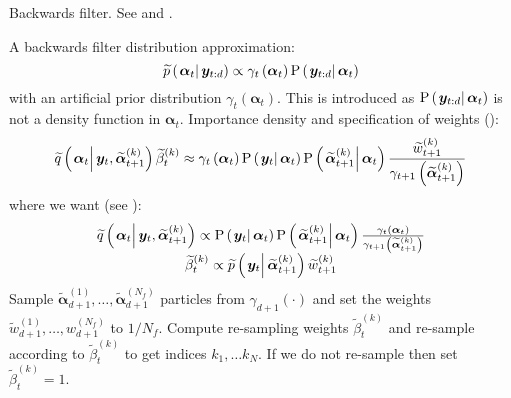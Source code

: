 \documentclass[9pt, notitlepage]{article}
\renewcommand{\vec}[1]{\bm{#1}}
\newcommand{\Lparen}[1]{\left( #1\right)}
\newcommand{\Cond}[2]{\left. #1 \vphantom{#2} \right\vert  #2}
\newcommand{\Prob}{\text{P}}
\newcommand{\optor}[2]{#1\Lparen{#2}}
\newcommand{\optorC}[3]{\optor{#1}{\Cond{#2}{#3}}}
\newcommand{\propC}[2]{\optorC{\Prob}{#1}{#2}}
\newcommand{\propAproxC}[2]{\optorC{\widetilde{p}}{#1}{#2}}
\newcommand{\IDAproxC}[2]{\optorC{\widetilde{q}}{#1}{#2}}
\newcommand{\partic}[3]{#1_{#2}^{\Lparen{#3}}}
\newcommand{\particB}[3]{\widetilde{#1}_{#2}^{\Lparen{#3}}}
\newcommand{\nPart}{N}
\newcommand{\nPeriods}{d}
\begin{document}
\begin{algorithm}[H]
\caption{Backwards filter. See \cite{briers10} and \cite{fearnhead10}.}\label{alg:backward}
\begin{algorithmic}[1]\raggedright
\INPUT
\Statex A backwards filter distribution approximation:
\begin{equation}
	\propAproxC{\vec{\alpha}_t}{\vec{y}_{t:\nPeriods}} \propto \gamma_t \Lparen{\vec{\alpha}_t}\propC{\vec{y}_{t:\nPeriods}}{\vec{\alpha}_t}
\end{equation}
\Statex with an  artificial prior distribution $\gamma_t \Lparen{\vec{\alpha}_t}$. This is introduced as $\propC{\vec{y}_{t:\nPeriods}}{\vec{\alpha}_t}$ is not a density function in $\vec{\alpha}_t$.
\Statex Importance density and specification of weights {\footnotesize (\citet[page 451 -- look in the example in the appendix]{fearnhead10})}:
\Statex\begin{equation}
	\IDAproxC{\vec{\alpha}_t}{\vec{y}_t, \particB{\vec{\alpha}}{t + 1}{k}}\particB{\beta}{t}{k} \approx %
		\gamma_t\Lparen{\vec{\alpha}_t}
		\propC{\vec{y}_t}{\vec{\alpha}_t}
		\propC{\particB{\vec{\alpha}}{t + 1}{k}}{\vec{\alpha}_t}
		\frac{\particB{w}{t + 1}{k}}{\gamma_{t + 1}\Lparen{\particB{\vec{\alpha}}{t + 1}{k}}}
\end{equation}
\Statex where we want {\footnotesize (see \citet[page 74]{briers10})}:
\Statex\begin{equation}\begin{matrix}
	\IDAproxC{\vec{\alpha}_t}{\vec{y}_t, \particB{\vec{\alpha}}{t + 1}{k}} \propto %
		\propC{\vec{y}_t}{\vec{\alpha}_t}
		\propC{\particB{\vec{\alpha}}{t + 1}{k}}{\vec{\alpha}_t}
		\frac{\gamma_t\Lparen{\vec{\alpha}_t}}{\gamma_{t + 1}\Lparen{\particB{\vec{\alpha}}{t + 1}{k}}} \\
	\particB{\beta}{t}{k} \propto %
		 \propAproxC{\vec{y}_t}{\particB{\vec{\alpha}}{t + 1}{k}}\particB{w}{t + 1}{k}
\end{matrix}\end{equation}
%
\State Sample $\particB{\vec{\alpha}}{\nPeriods+1}{1},\dots,\particB{\vec{\alpha}}{\nPeriods+1}{\nPart_f}$ particles from $\gamma_{\nPeriods+1}(\cdot)$ and set the weights $\particB{w}{\nPeriods + 1}{1},\dots,\partic{w}{\nPeriods+1}{\nPart_f}$ to $1 / \nPart_f$.
%
\For{$t=\nPeriods,\dots, 1$}
\State Compute re-sampling weights $\particB{\beta}{t}{k}$ and re-sample according to $\particB{\beta}{t}{k}$ to get indices $k_1,\dots k_\nPart$. If we do not re-sample then set $\particB{\beta}{t}{k} = 1$.
\EndProcedure
%

\end{algorithmic}
\end{algorithm}
\end{document}
